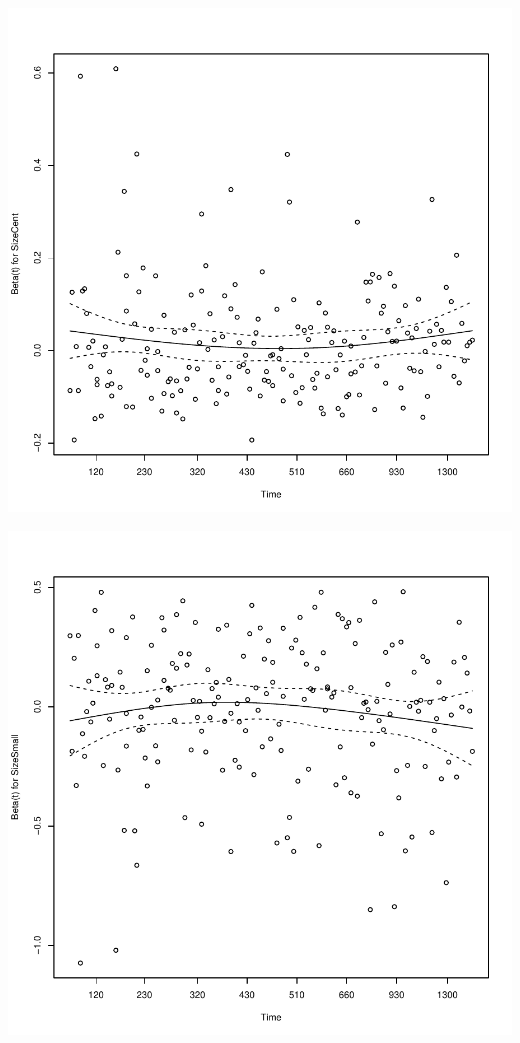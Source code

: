 \documentclass{article}\usepackage[]{graphicx}\usepackage[]{color}
\makeatletter
\def\maxwidth{ %
  \ifdim\Gin@nat@width>\linewidth
    \linewidth
  \else
    \Gin@nat@width
  \fi
}
\newenvironment{knitrout}{}{} %
\makeatother
\begin{document}
\begin{knitrout}
{}




{\centering \includegraphics[width=\maxwidth]{figure/eda-ph-check-full-3-4} 

}




{\centering \includegraphics[width=\maxwidth]{figure/eda-ph-check-full-3-5} 

}
\end{knitrout}
\end{document}
